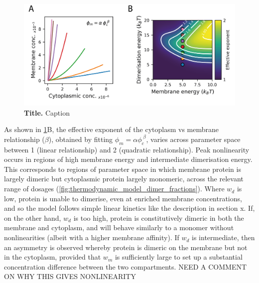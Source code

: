 \documentclass[12pt]{"article"}
\newcommand{\mycaption}[2]{\caption[#1]{\textbf{#1.} #2}}
\begin{document}
\begin{figure}[!h]
\includegraphics[scale=1]{thermodynamic_model_feedback}
\setlength{\abovecaptionskip}{20pt}
\centering
\mycaption{Title}{Caption}
\label{fig:thermodynamic_model_feedback}
\end{figure}

As shown in \cref{fig:thermodynamic_model_feedback}B, the effective exponent of the cytoplasm vs membrane relationship ($\beta$), obtained by fitting $\phi_m = \alpha \phi_c^{\;\beta}$, varies across parameter space between 1 (linear relationship) and 2 (quadratic relationship). Peak nonlinearity occurs in regions of high membrane energy and intermediate dimerisation energy. This corresponds to regions of parameter space in which membrane protein is largely dimeric but cytoplasmic protein largely monomeric, across the relevant range of dosages (\cref{fig:thermodynamic_model_dimer_fractions}). Where $w_d$ is low, protein is unable to dimerise, even at enriched membrane concentrations, and so the model follows simple linear kinetics like the description in section x. If, on the other hand, $w_d$ is too high, protein is constitutively dimeric in both the membrane and cytoplasm, and will behave similarly to a monomer without nonlinearities (albeit with a higher membrane affinity). If $w_d$ is intermediate, then an asymmetry is observed whereby protein is dimeric on the membrane but not in the cytoplasm, provided that $w_m$ is sufficiently large to set up a substantial concentration difference between the two compartments. NEED A COMMENT ON WHY THIS GIVES NONLINEARITY\\
\end{document}
